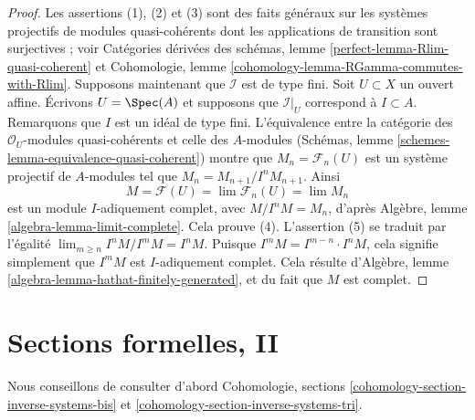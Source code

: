 \begin{proof}
Les assertions (1), (2) et (3) sont des faits généraux sur les systèmes projectifs de
modules quasi-cohérents dont les applications de transition sont surjectives ; voir
Catégories dérivées des schémas, lemme \ref{perfect-lemma-Rlim-quasi-coherent}
et Cohomologie, lemme \ref{cohomology-lemma-RGamma-commutes-with-Rlim}.
Supposons maintenant que $\mathcal{I}$ est de type fini.
Soit $U \subset X$ un ouvert affine. Écrivons $U = \Spec(A)$ et supposons que $\mathcal{I}|_U$
correspond à $I \subset A$. Remarquons que $I$ est un idéal de type fini.
L'équivalence entre la catégorie des $\mathcal{O}_U$-modules quasi-cohérents
et celle des $A$-modules (Schémas, lemme \ref{schemes-lemma-equivalence-quasi-coherent})
montre que $M_n = \mathcal{F}_n(U)$ est un système projectif
de $A$-modules tel que $M_n = M_{n + 1}/I^nM_{n + 1}$. Ainsi
$$
M = \mathcal{F}(U) = \lim \mathcal{F}_n(U) = \lim M_n
$$
est un module $I$-adiquement complet, avec $M/I^nM = M_n$, d'après
Algèbre, lemme \ref{algebra-lemma-limit-complete}. Cela prouve (4).
L'assertion (5) se traduit par l'égalité
$\lim_{m \geq n} I^nM/I^mM = I^nM$.
Puisque $I^mM = I^{m - n} \cdot I^nM$, cela signifie simplement que
$I^mM$ est $I$-adiquement complet. Cela résulte
d'Algèbre, lemme \ref{algebra-lemma-hathat-finitely-generated},
et du fait que $M$ est complet.
\end{proof}





\section{Sections formelles, II}
\label{section-formal-functions-principal}

\noindent
Nous conseillons de consulter d'abord
Cohomologie, sections
\ref{cohomology-section-inverse-systems-bis} et
\ref{cohomology-section-inverse-systems-tri}.

